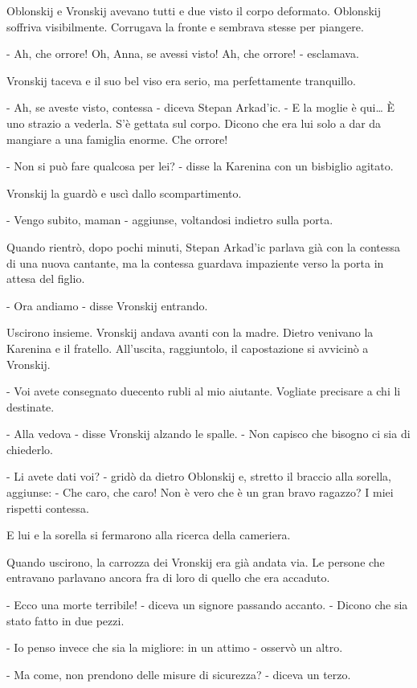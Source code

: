 Oblonskij e Vronskij avevano tutti e due visto il corpo deformato. Oblonskij soffriva visibilmente. Corrugava la fronte e sembrava stesse per piangere. 

- Ah, che orrore! Oh, Anna, se avessi visto! Ah, che orrore! - esclamava. 

Vronskij taceva e il suo bel viso era serio, ma perfettamente tranquillo. 

- Ah, se aveste visto, contessa - diceva Stepan Arkad'ic. - E la moglie è qui\ldots{} È uno strazio a vederla. S'è gettata sul corpo. Dicono che era lui solo a dar da mangiare a una famiglia enorme. Che orrore! 

- Non si può fare qualcosa per lei? - disse la Karenina con un bisbiglio agitato. 

Vronskij la guardò e uscì dallo scompartimento. 

- Vengo subito, maman - aggiunse, voltandosi indietro sulla porta. 

Quando rientrò, dopo pochi minuti, Stepan Arkad'ic parlava già con la contessa di una nuova cantante, ma la contessa guardava impaziente verso la porta in attesa del figlio. 

- Ora andiamo - disse Vronskij entrando. 

Uscirono insieme. Vronskij andava avanti con la madre. Dietro venivano la Karenina e il fratello. All'uscita, raggiuntolo, il capostazione si avvicinò a Vronskij. 

- Voi avete consegnato duecento rubli al mio aiutante. Vogliate precisare a chi li destinate. 

- Alla vedova - disse Vronskij alzando le spalle. - Non capisco che bisogno ci sia di chiederlo. 

- Li avete dati voi? - gridò da dietro Oblonskij e, stretto il braccio alla sorella, aggiunse: - Che caro, che caro! Non è vero che è un gran bravo ragazzo? I miei rispetti contessa. 

E lui e la sorella si fermarono alla ricerca della cameriera. 

Quando uscirono, la carrozza dei Vronskij era già andata via. Le persone che entravano parlavano ancora fra di loro di quello che era accaduto. 

- Ecco una morte terribile! - diceva un signore passando accanto. - Dicono che sia stato fatto in due pezzi. 

- Io penso invece che sia la migliore: in un attimo - osservò un altro. 

- Ma come, non prendono delle misure di sicurezza? - diceva un terzo. 


